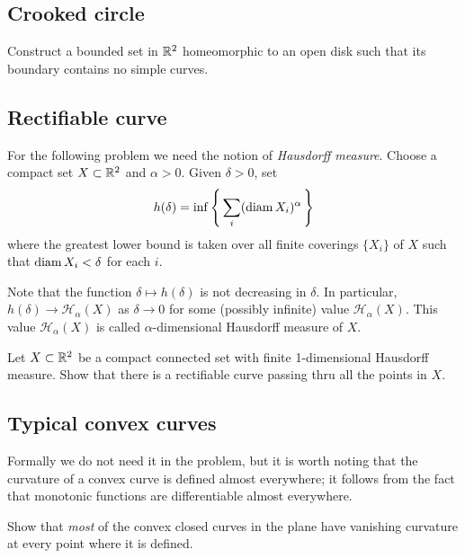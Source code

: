 \subsection*{Crooked circle}

\label{Crooked circle}

\begin{pr}
Construct 
a bounded set in $\mathbb{R}^2$
homeomorphic to an open disk
such that 
its boundary contains no simple curves.
\end{pr}

\subsection*{Rectifiable curve}
\label{Rectifiable curve}

For the following problem we need the notion of 
\emph{Hausdorff measure}.
Choose a compact set $X\subset\mathbb{R}^2$ and $\alpha>0$.
Given $\delta>0$, set
\[h(\delta)=\inf\left\{\,\sum_i(\operatorname{\rm diam}\nolimits X_i)^\alpha\,\right\}\]
where the greatest lower bound is taken over all finite coverings $\{X_i\}$ of $X$ 
such that $\operatorname{\rm diam}\nolimits X_i<\delta$ for each $i$.

Note that the function $\delta\mapsto h(\delta)$ is not decreasing in $\delta$.
In particular, $h(\delta)\to \mathcal{H}_\alpha(X)$ as $\delta\to 0$ for some (possibly infinite) value $\mathcal{H}_\alpha(X)$.
This value $\mathcal{H}_\alpha(X)$ is called $\alpha$-dimensional Hausdorff measure of $X$.

\begin{pr}
Let $X\subset \mathbb{R}^2$ be a compact connected set
with finite 1-dimensional Hausdorff measure. 
Show that there is a rectifiable curve passing thru all the points in $X$.
\end{pr}

\subsection*{Typical convex curves}

Formally we do not need it in the problem, 
but it is worth noting that the curvature of a convex curve is defined almost everywhere;
it follows from the fact that monotonic functions are differentiable almost everywhere.

\begin{pr}
Show that \emph{most} of the convex closed curves in the plane
have vanishing curvature at every point where it is defined.
\end{pr}

